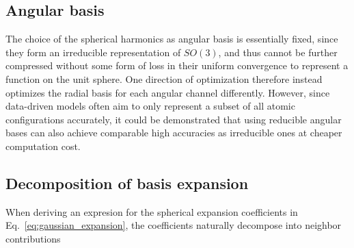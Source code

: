\subsection{Angular basis}
The choice of the spherical harmonics as angular basis is essentially fixed, since they form an irreducible representation of $SO(3)$, and thus cannot be further compressed without some form of loss in their uniform convergence to represent a function on the unit sphere\cite{ragozin1971uniform}.
One direction of optimization therefore instead optimizes the radial basis for each angular channel differently\cite{goscinski2021optimal,bigi2022smooth}.
However, since data-driven models often aim to only represent a subset of all atomic configurations accurately, it could be demonstrated that using reducible angular bases\cite{shapeev2016moment,schutt2021equivariant,simeon2023tensornet} can also achieve comparable high accuracies as irreducible ones at cheaper computation cost\cite{zuo2020performance,xie2023ultra}.


\subsection{Decomposition of basis expansion}
When deriving an expresion for the spherical expansion coefficients in Eq.~\eqref{eq:gaussian_expansion}, the coefficients naturally decompose into neighbor contributions

